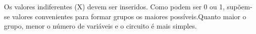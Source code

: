 \documentclass[12pt,a4paper,portrait]{article}
\begin{document}
			\begin{minipage}{1.1\textwidth}
				\begin{minipage}[b]{0.49\textwidth}
					\centering
					\\
				\end{minipage}
				\hfill
				\begin{minipage}[b]{0.49\textwidth}
					\centering
				\end{minipage}
			\end{minipage}\\
			\begin{minipage}{1.1\textwidth}
				\begin{minipage}[b]{0.49\textwidth}
					\centering
					\\
				\end{minipage}
				\hfill
				\begin{minipage}[b]{0.49\textwidth}
				\end{minipage}
			\end{minipage}\\\\									
			Os valores indiferentes (X) devem ser inseridos. Como podem ser 0 ou 1, supõem-se valores convenientes para formar grupos os maiores possíveis.Quanto maior o grupo, menor o número de variáveis e o circuito é mais simples.\\
\end{document}
